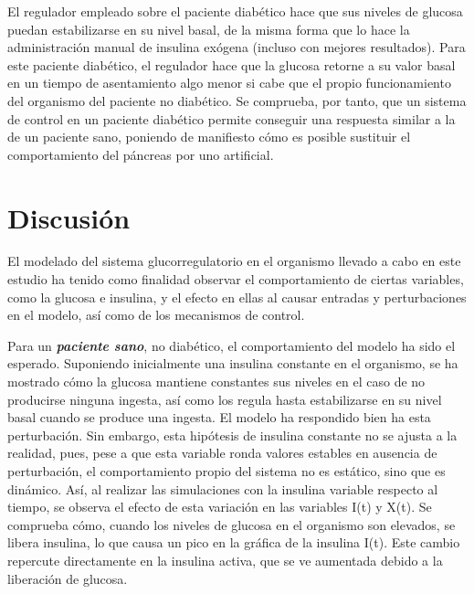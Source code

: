 El regulador empleado sobre el paciente diabético hace que sus niveles de glucosa puedan estabilizarse en su nivel basal, de la misma forma que lo hace la administración manual de insulina exógena (incluso con mejores resultados). Para este paciente diabético, el regulador hace que la glucosa retorne a su valor basal en un tiempo de asentamiento algo menor si cabe que el propio funcionamiento del organismo del paciente no diabético. Se comprueba, por tanto, que un sistema de control en un paciente diabético permite conseguir una respuesta similar a la de un paciente sano, poniendo de manifiesto cómo es posible sustituir el comportamiento del páncreas por uno artificial.

\section{Discusión}

El modelado del sistema glucorregulatorio en el organismo llevado a cabo en este estudio ha tenido como finalidad observar el comportamiento de ciertas variables, como la glucosa e insulina, y el efecto en ellas al causar entradas y perturbaciones en el modelo, así como de los mecanismos de control.

Para un \textit{\textbf{paciente sano}}, no diabético, el comportamiento del modelo ha sido el esperado. Suponiendo inicialmente una insulina constante en el organismo, se ha mostrado cómo la glucosa mantiene constantes sus niveles en el caso de no producirse ninguna ingesta, así como los regula hasta estabilizarse en su nivel basal cuando se produce una ingesta. El modelo ha respondido bien ha esta perturbación. Sin embargo, esta hipótesis de insulina constante no se ajusta a la realidad, pues, pese a que esta variable ronda valores estables en ausencia de perturbación, el comportamiento propio del sistema no es estático, sino que es dinámico. Así, al realizar las simulaciones con la insulina variable respecto al tiempo, se observa el efecto de esta variación en las variables I(t) y X(t). Se comprueba cómo, cuando los niveles de glucosa en el organismo son elevados, se libera insulina, lo que causa un pico en la gráfica de la insulina I(t). Este cambio repercute directamente en la insulina activa, que se ve aumentada debido a la liberación de glucosa. 

